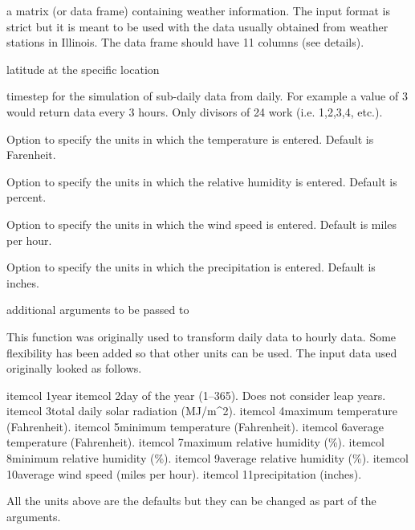 \documentclass[letterpaper]{book}
\begin{document}
%
\begin{Arguments}
\begin{ldescription}
\item[\code{X}] a matrix (or data frame) containing weather
information.  The input format is strict but it is meant
to be used with the data usually obtained from weather
stations in Illinois. The data frame should have 11
columns (see details).

\item[\code{lati}] latitude at the specific location

\item[\code{ts}] timestep for the simulation of sub-daily data
from daily. For example a value of 3 would return data
every 3 hours. Only divisors of 24 work (i.e. 1,2,3,4,
etc.).

\item[\code{temp.units}] Option to specify the units in which
the temperature is entered. Default is Farenheit.

\item[\code{rh.units}] Option to specify the units in which the
relative humidity is entered. Default is percent.

\item[\code{ws.units}] Option to specify the units in which the
wind speed is entered. Default is miles per hour.

\item[\code{pp.units}] Option to specify the units in which the
precipitation is entered. Default is inches.

\item[\code{list()}] additional arguments to be passed to
\end{ldescription}
\end{Arguments}
%
\begin{Details}\relax
This function was originally used to transform daily data
to hourly data. Some flexibility has been added so that
other units can be used. The input data used originally
looked as follows. \begin{enumerate}


\bsl{}itemcol 1year \bsl{}itemcol 2day of the year (1--365). Does not
consider leap years. \bsl{}itemcol 3total daily solar radiation
(MJ/m\textasciicircum{}2). \bsl{}itemcol 4maximum temperature (Fahrenheit).
\bsl{}itemcol 5minimum temperature (Fahrenheit). \bsl{}itemcol
6average temperature (Fahrenheit). \bsl{}itemcol 7maximum
relative humidity (\%). \bsl{}itemcol 8minimum relative humidity
(\%). \bsl{}itemcol 9average relative humidity (\%). \bsl{}itemcol
10average wind speed (miles per hour). \bsl{}itemcol
11precipitation (inches). 
\end{enumerate}


All the units above are the defaults but they can be
changed as part of the arguments.
\end{Details}
\end{document}
